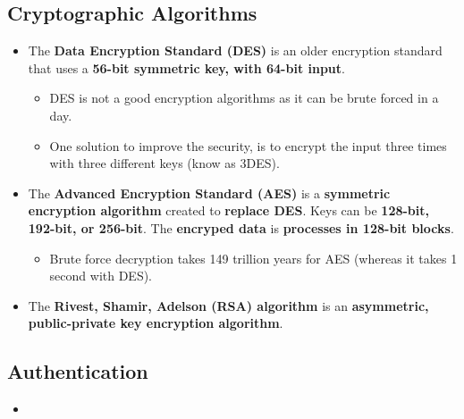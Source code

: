 \documentclass{article}
\begin{document}
    \subsection*{Cryptographic Algorithms}
    \begin{itemize}
        \item The \textbf{Data Encryption Standard (DES)} is an older encryption standard that uses a \textbf{56-bit symmetric key, with 64-bit input}.
        \begin{itemize}
            \item DES is not a good encryption algorithms as it can be brute forced in a day.
            \item One solution to improve the security, is to encrypt the input three times with three different keys (know as 3DES).
        \end{itemize}
        \item The \textbf{Advanced Encryption Standard (AES)} is a \textbf{symmetric encryption algorithm} created to \textbf{replace DES}. Keys can be \textbf{128-bit, 192-bit, or 256-bit}. The \textbf{encryped data} is \textbf{processes in 128-bit blocks}.
        \begin{itemize}
            \item Brute force decryption takes 149 trillion years for AES (whereas it takes 1 second with DES).
        \end{itemize}
        \item The \textbf{Rivest, Shamir, Adelson (RSA) algorithm} is an \textbf{asymmetric, public-private key encryption algorithm}.
    \end{itemize}

    \subsection*{Authentication}
    \begin{itemize}
        \item 
    \end{itemize}
\end{document}
